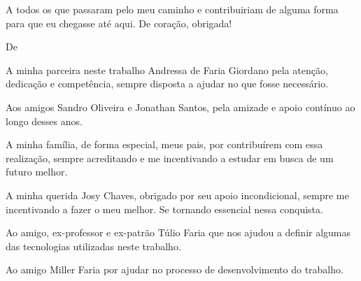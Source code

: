 \par A todos os que passaram pelo meu caminho e contribuiriam de alguma forma para que eu chegasse até aqui. De coração, obrigada!


\vspace*{\fill}
De \imprimirAutorDois
\newline
\par A minha parceira neste trabalho Andressa de Faria Giordano pela atenção, dedicação e competência, sempre disposta a ajudar no que fosse necessário.

\par Aos amigos Sandro Oliveira e Jonathan Santos, pela amizade e apoio contínuo ao longo desses anos.

\par A minha família, de forma especial, meus pais, por contribuírem com essa realização, sempre acreditando e me incentivando a estudar em busca de um futuro melhor.

\par A minha querida Josy Chaves, obrigado por seu apoio incondicional, sempre me incentivando a fazer o meu melhor. Se tornando essencial nessa conquista.

\par Ao amigo, ex-professor e ex-patrão Túlio Faria que nos ajudou a definir algumas das tecnologias utilizadas neste trabalho.

\par Ao amigo Miller Faria por ajudar no processo de desenvolvimento do trabalho.





